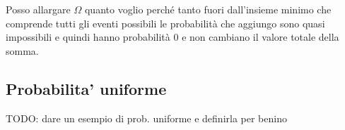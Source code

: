 


Posso allargare \( \Omega \) quanto voglio perché tanto fuori dall'insieme minimo che comprende tutti gli eventi possibili le probabilità che aggiungo sono quasi impossibili e quindi hanno probabilità 0 e non cambiano il valore totale della somma.

\subsection{Probabilita' uniforme}
TODO: dare un esempio di prob. uniforme e definirla per benino

% 
